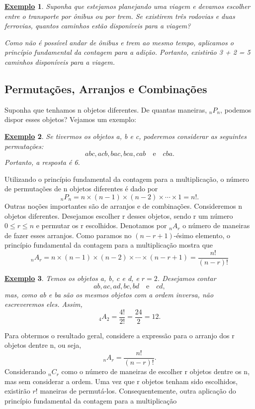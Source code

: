\documentclass{article}
\newtheorem{example}{\underline{Exemplo}}
\begin{document}
\begin{example}
  Suponha que estejamos planejando uma viagem e devamos escolher entre o transporte por ônibus ou por trem.
  Se existirem três rodovias e duas ferrovias, quantos caminhos estão disponíveis para a viagem?

  Como não é possível andar de ônibus e trem ao mesmo tempo, aplicamos o princípio fundamental da contagem para a adição.
  Portanto, existirão 3 + 2 = 5 caminhos disponíveis para a viagem.
\end{example}
\subsection{Permutações, Arranjos e Combinações}
Suponha que tenhamos n objetos diferentes. De quantas maneiras, \(_{n}P_{n}\), podemos dispor esses objetos?
Vejamos um exemplo:
\begin{example}
  Se tivermos os objetos a, b e c, poderemos considerar as seguintes permutações: 
  \[
    abc, acb, bac, bca, cab\quad\text{e}\quad cba.
  \]
  Portanto, a resposta é 6.
\end{example}
Utilizando o princípio fundamental da contagem para a multiplicação, o número de permutações
de n objetos diferentes é dado por 
\[
  _{n}P_{n} = n\times(n-1)\times(n-2)\times \cdots\times 1 = n!.
\]
Outras noções importantes são de arranjos e de combinações. Consideremos n objetos diferentes. Desejamos 
escolher r desses objetos, sendo r um número \(0\leq r\leq n\) e permutar os r
escolhidos. Denotamos por \(_{n}A_{r}\) o número de maneiras de fazer esses arranjos.
Como paramos no \((n-r+1)\)-ésimo elemento, o princípio fundamental da contagem para a multiplicação mostra que 
\[
  _{n}A_{r} = n\times(n-1)\times(n-2)\times \cdots\times(n-r+1) = \frac{n!}{(n-r)!}
\]
\begin{example}
  Temos os objetos a, b, c e d, e \(r=2\). Desejamos contar 
  \[
    ab, ac, ad, bc, bd\quad\text{e}\quad cd,
  \]
  mas, como ab e ba são os mesmos objetos com a ordem inversa, não escreveremos eles. Assim, 
  \[
    _{4}A_{2} = \frac{4!}{2!} = \frac{24}{2} = 12.
  \]
\end{example}
Para obtermos o resultado geral, considere a expressão para o arranjo dos r objetos dentre n, ou seja, 
\[
  _{n}A_{r} = \frac{n!}{(n-r)!}.
\]
Considerando \(_{n}C_{r}\) como o número de maneiras de escolher r objetos dentre os n, mas 
sem considerar a ordem. Uma vez que r objetos tenham sido escolhidos, existirão \(r!\) maneiras
de permutá-los. Consequentemente, outra aplicação do princípio fundamental da contagem para a multiplicação 
\end{document}
